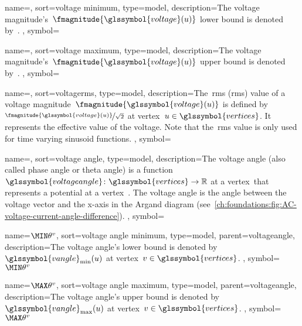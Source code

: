 {
    name={\voltagemin},
    sort={voltage minimum},
    type={model},
    description={The voltage magnitude's~$\fmagnitude{\glssymbol{voltage}
    (\vertexa)}$ lower bound is denoted by~.
    },
    symbol={\voltagemin}
}

{
    name={\voltagemax},
    sort={voltage maximum},
    type={model},
    description={The voltage magnitude's~$\fmagnitude{\glssymbol{voltage}
    (\vertexa)}$ upper bound is denoted by~.
    },%
    symbol={\voltagemax}
}

{
    name={\voltagerms},
    sort={voltagerms},
    type={model},
    description={The~\acrlong{rms} (\gls{rms}) value of a voltage
    magnitude~$\fmagnitude{\glssymbol{voltage}(\vertexa)}$ is defined
    by~$\nicefrac{\fmagnitude{\glssymbol{voltage}(\vertexa)}}{\sqrt{2}}$ at
    vertex~$\vertexa\in\glssymbol{vertices}$. It represents the effective value
    of the voltage. Note that the~\gls{rms} value is only used for time varying
    sinusoid functions.
    },
    symbol={\voltagerms}
}

{
    name={\vangle},
    sort={voltage angle},
    type={model},
    description={The voltage angle (also called phase angle or theta angle) is a
    function~$\glssymbol{voltageangle}\colon\glssymbol{vertices}\to\reals$ at a
    vertex~\vertexa that represents a potential at a vertex~\vertexa. The
    voltage angle is the angle between the voltage vector and the x-axis in the
    Argand diagram
    (see~\cref{ch:foundations:fig:AC-voltage-current-angle-difference}).
    },
    symbol={\vangle}
}

{
    name={\ensuremath{\vanglemin}},
    sort={voltage angle minimum},
    type={model},
    parent={voltageangle},
    description={The voltage angle's lower bound is denoted
    by~$\glssymbol{vangle}_{\min}(\vertexa)$ at
    vertex~$\vertex\in\glssymbol{vertices}$.
    },
    symbol={\ensuremath{\vanglemin}}
}

{
    name={\ensuremath{\vanglemax}},
    sort={voltage angle maximum},
    type={model},
    parent={voltageangle},
    description={The voltage angle's upper bound is denoted
    by~$\glssymbol{vangle}_{\max}(\vertexa)$ at
    vertex~$\vertex\in\glssymbol{vertices}$.
    },
    symbol={\ensuremath{\vanglemax}}
}

